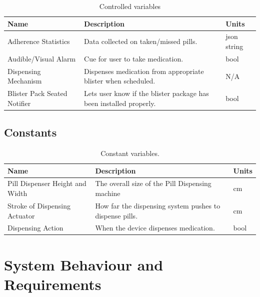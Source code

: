 \documentclass[12pt,titlepage]{article}
\begin{document}
\begin{table}[ht!]
\begin{center}
\begin{adjustbox}{max width=\textwidth}
\small
\begin{tabular}{|p{}|p{}|p{}|}
 \hline
 \textbf{Name} & \textbf{Description} & \textbf{Units}\\
 \hline 
 Adherence Statistics & Data collected on taken/missed pills. & json string\\
 \hline
 Audible/Visual Alarm & Cue for user to take medication. & bool \\
 \hline
 Dispensing Mechanism & Dispenses medication from appropriate blister when scheduled. & N/A\\
 \hline
 Blister Pack Seated Notifier & Lets user know if the blister package has been installed properly. & bool\\
 \hline
\end{tabular}
\end{adjustbox}
\end{center}
\caption{Controlled variables}
\end{table}

\subsection{Constants}
\begin{table}[ht!]
\begin{center}
\begin{adjustbox}{max width=\textwidth}
\small
\begin{tabular}{|p{}|p{}|p{}|}
 \hline
 \textbf{Name} & \textbf{Description} & \textbf{Units}\\
 \hline 
 Pill Dispenser Height and Width & The overall size of the Pill Dispensing machine & cm\\
 \hline
  Stroke of Dispensing Actuator & How far the dispensing system pushes to dispense pills. & cm\\
 \hline
   Dispensing Action & When the device dispenses medication. & bool\\
 \hline
\end{tabular}
\end{adjustbox}
\end{center}
\caption{Constant variables.}
\end{table}


\section{System Behaviour and Requirements}
\end{document}
